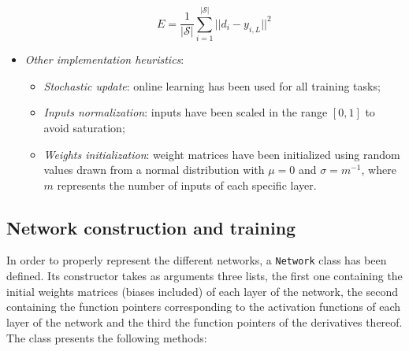 \documentclass[letterpaper,headings=standardclasses]{scrartcl}
\begin{document}
\begin{itemize}
    $$ E = \frac{1}{|\mathcal{S}|} \sum_{i = 1}^{|\mathcal{S}|} || d_i - y_{i,L} ||^2 $$
    
    \item \emph{Other implementation heuristics}:
    
    \begin{itemize}
        \item \emph{Stochastic update}: online learning has been used for all training tasks;
        \item \emph{Inputs normalization}: inputs have been scaled in the range $[0,1]$ to avoid saturation;
        \item \emph{Weights initialization}: weight matrices have been initialized using random values drawn from a normal distribution with $\mu = 0$ and $\sigma = m^{-1}$, where $m$ represents the number of inputs of each specific layer.
    \end{itemize}

\end{itemize}

\subsection{Network construction and training}

In order to properly represent the different networks, a \texttt{Network} class has been defined. Its constructor takes as arguments three lists, the first one containing the initial weights matrices (biases included) of each layer of the network, the second containing the function pointers corresponding to the activation functions of each layer of the network and the third the function pointers of the derivatives thereof. The class presents the following methods:
\end{document}
